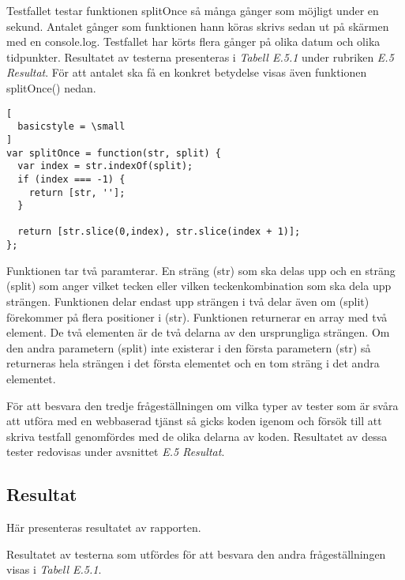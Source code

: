 Testfallet testar funktionen splitOnce så många gånger som möjligt
under en sekund. Antalet gånger som funktionen hann köras skrivs
sedan ut på skärmen med en console.log. 
Testfallet har körts flera gånger på olika datum och olika tidpunkter.
Resultatet av testerna presenteras i \emph{Tabell E.5.1}
under rubriken \emph{E.5 Resultat}.
För att antalet ska
få en konkret betydelse visas även funktionen splitOnce() nedan.

\begin{lstlisting}[
  basicstyle = \small
]
var splitOnce = function(str, split) {
  var index = str.indexOf(split);
  if (index === -1) {
    return [str, ''];
  }

  return [str.slice(0,index), str.slice(index + 1)];
};
\end{lstlisting}

Funktionen tar två paramterar. En sträng (str) som ska delas upp och 
en sträng (split) som anger vilket tecken eller vilken teckenkombination
som ska dela upp strängen. Funktionen delar endast upp strängen i två delar
även om (split) förekommer på flera positioner i (str). Funktionen returnerar 
en array med två element.
De två elementen är de två delarna av den ursprungliga strängen. Om den andra
parametern (split) inte existerar i den första parametern (str) så returneras
hela strängen i det första elementet och en tom sträng i det andra elementet.

För att besvara den tredje frågeställningen om vilka typer av tester som är 
svåra att utföra med en webbaserad tjänst så gicks koden igenom och 
försök till att skriva testfall genomfördes
med de olika delarna av koden. Resultatet av dessa tester redovisas under 
avsnittet \emph{E.5 Resultat}.

\subsection{Resultat}
Här presenteras resultatet av rapporten.

Resultatet av testerna som utfördes för att besvara den andra frågeställningen
visas i \emph{Tabell E.5.1}.

